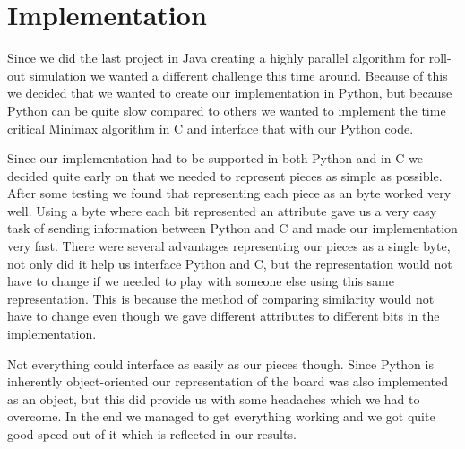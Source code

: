 \section{Implementation}\label{implementation}
Since we did the last project in Java creating a highly parallel algorithm for
roll-out simulation we wanted a different challenge this time around. Because
of this we decided that we wanted to create our implementation in Python, but
because Python can be quite slow compared to others we wanted to implement the
time critical Minimax algorithm in C and interface that with our Python code.

Since our implementation had to be supported in both Python and in C we decided
quite early on that we needed to represent pieces as simple as possible. After
some testing we found that representing each piece as an byte worked very well.
Using a byte where each bit represented an attribute gave us a very easy task
of sending information between Python and C and made our implementation very
fast. There were several advantages representing our pieces as a single byte,
not only did it help us interface Python and C, but the representation would
not have to change if we needed to play with someone else using this same
representation. This is because the method of comparing similarity would not
have to change even though we gave different attributes to different bits in
the implementation.

Not everything could interface as easily as our pieces though. Since Python is inherently
object-oriented our representation of the \quarto{} board was also implemented as
an object, but this did provide us with some headaches which we had to overcome.
In the end we managed to get everything working and we got quite good speed out of
it which is reflected in our results.
